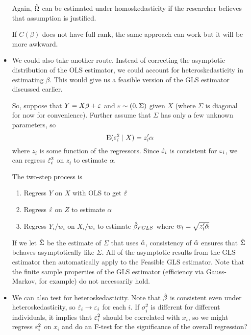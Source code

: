 \begin{itemize}
  Again, $\hat{\Omega}$ can be estimated under homoskedasticity if the
  researcher believes that assumption is justified.

  If $C(\beta)$ does not have full rank, the same approach can work but it
  will be more awkward.

\item We could also take another route.  Instead of correcting the
  asymptotic distribution of the OLS estimator, we could account for
  heteroskedasticity in estimating $\beta$.  This would give us a feasible
  version of the GLS estimator discussed earlier.

  So, suppose that $Y = X \beta + \varepsilon$ and $\varepsilon \sim (0, \Sigma)$ given $X$ (where
  $\Sigma$ is diagonal for now for convenience).
  Further assume that $\Sigma$ has only a few unknown parameters,
  so
  \begin{equation*}
    \operatorname{E}(\varepsilon^2_i \mid X) = z_i'\alpha
  \end{equation*}
  where $z_i$ is some function of the regressors.  Since $\hat{\varepsilon}_i$ is
  consistent for $\varepsilon_i$, we can regress $\hat{\varepsilon}^2_i$ on $z_i$ to
  estimate $\alpha$.

  The two-step process is
  \begin{enumerate}
  \item Regress $Y$ on $X$ with OLS to get $\hat{\varepsilon}$
  \item Regress $\hat{\varepsilon}$ on $Z$ to estimate $\alpha$
  \item Regress $Y_i/w_i$ on $X_i/w_i$ to estimate $\hat{\beta}_{FGLS}$ where
    $w_i = \sqrt{z_i'\hat{\alpha}}$
  \end{enumerate}

  If we let $\hat{\Sigma}$ be the estimate of $\Sigma$ that uses $\hat{\alpha}$, consistency
  of $\hat{\alpha}$ ensures that $\hat{\Sigma}$ behaves asymptotically like $\Sigma$.  All of
  the asymptotic results from the GLS estimator then automatically
  apply to the Feasible GLS estimator.  Note that the finite sample
  properties of the GLS estimator (efficiency via Gauss-Markov, for
  example) do not necessarily hold.

\item We can also test for heteroskedasticity.  Note that $\hat{\beta}$ is
  consistent even under heteroskedasticity, so $\hat{\varepsilon}_i \to \varepsilon_i$ for
  each $i$.  If $\sigma^2_i$ is different for different individuals, it
  implies that $\varepsilon^2_i$ should be correlated with $x_i$, so we might
  regress $\varepsilon^2_i$ on $x_i$ and do an F-test for the significance of
  the overall regression?


\end{itemize}
